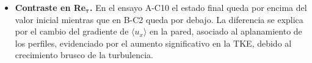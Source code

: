 \begin{itemize}
  \item \textbf{Contraste en Re$\mathbf{_{\tau}}$.} En el ensayo A-C10 el estado final queda por encima del valor inicial mientras que en B-C2 queda por debajo. La diferencia se explica por el cambio del gradiente de $\langle u_x \rangle$ en la pared, asociado al aplanamiento de los perfiles, evidenciado por el aumento significativo en la TKE, debido al crecimiento brusco de la turbulencia.

\end{itemize}

